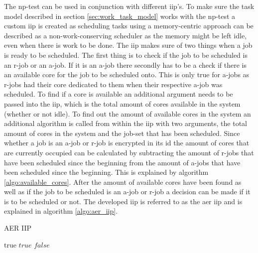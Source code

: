 \documentclass{kththesis}
\begin{document}
The \acrshort{np}-test can be used in conjunction with different \acrshort{iip}'s. To make sure the
task model described in section \ref{sec:work_task_model} works with the np-test a custom
\acrshort{iip} is
created as scheduling tasks using a memory-centric approach can be described as a
non-work-conserving scheduler as the memory might be left idle, even when there is work to be done.
The \acrshort{iip} makes sure of two things when a job is ready to be scheduled. The first thing is
to check if the job to be scheduled is an \acrshort{r}-job or an \acrshort{a}-job. If it is an
\acrshort{a}-job there secondly has to be a check if there is an available core for the job to be
scheduled onto. This is only true for \acrshort{a}-jobs as \acrshort{r}-jobs had their core
dedicated to them when their respective \acrshort{a}-job was scheduled. To find if a core is
available an additional argument needs to be passed into the \acrshort{iip}, which is the total
amount of cores available in the system (whether or not idle). To find out the amount of available
cores in the system an additional algorithm is called from within the \acrshort{iip} with two
arguments, the total amount of cores in the system and the job-set that has been scheduled. Since
whether a job is an \acrshort{a}-job or \acrshort{r}-job is encrypted in its id the amount of cores
that are currently occupied can be calculated by subtracting the amount of \acrshort{r}-jobs that
have been scheduled since the beginning from the amount of \acrshort{a}-jobs that have been
scheduled since the beginning. This is explained by algorithm \ref{algo:available_cores}. After the
amount of available cores have been found as well as if the job to be scheduled is an
\acrshort{a}-job or \acrshort{r}-job a decision can be made if it is to be scheduled or not. The
developed \acrshort{iip} is referred to as the \acrshort{aer} \acrshort{iip} and is explained in
algorithm \ref{algo:aer_iip}.

\begin{algorithm}
    \caption{AER IIP}
    \label{algo:aer_iip}
    \begin{algorithmic}[1]
                \State \Return true
            \Else
                    \State \Return $true$
                \Else
                    \State \Return $false$
                \EndIf
            \EndIf
        \EndFunction
    \end{algorithmic}
\end{algorithm}
\end{document}
